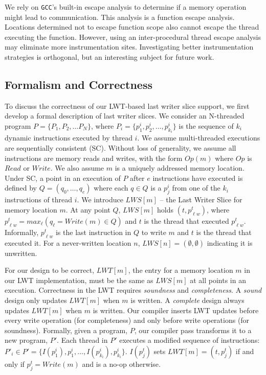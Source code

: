 \documentclass[preprint,9pt]{sigplanconf}
\newcommand{\lwt}{LWT\xspace}
\begin{document}
We rely on {\tt GCC}'s built-in escape analysis to determine if a memory
operation might lead to communication.  This analysis is a function escape
analysis.  Locations determined not to escape function scope also cannot escape
the thread executing the function.  However, using an inter-procedural thread
escape analysis may eliminate more instrumentation sites.  Investigating better
instrumentation strategies is orthogonal, but an interesting subject for future
work.

\subsection{Formalism and Correctness}
\label{sec:lwssoundness}
To discuss the correctness of our \lwt-based last writer slice support, we
first develop a formal description of last writer slices.  We consider an
N-threaded program $P = \{P_1, P_2, \ldots P_N\}$, where $P_i = \{p^{i}_{1},
p^{i}_{2}, \ldots, p^{i}_{k_{i}}\}$ is the sequence of $k_{i}$ dynamic
instructions executed by thread $i$.  We assume multi-threaded executions are
sequentially consistent (SC).  Without loss of generality, we assume all
instructions are memory reads and writes, with the form $Op(m)$ where $Op$ is
$Read$ or $Write$. We also assume $m$ is a uniquely addressed memory location.
Under SC, a point in an execution of $P$ after $e$ instructions have
executed is defined by $Q = (q_{0}, \ldots, q_{e})$ where each $q \in Q$ is a
$p^{i}_{j}$ from one of the $k_i$ instructions of thread $i$. We introduce
$LWS[m]$ -- the Last Writer Slice for memory location $m$.   At any point $Q$,
$LWS[m]$ holds $(t,p^{t}_{\ell w})$, where $p^{t}_{\ell w} = max_{\ell}( 
q_{\ell} = Write(m) \in Q)$ and $t$ is the thread that
executed $p^{t}_{\ell w}$. Informally, $p^{t}_{\ell w}$ is the last instruction
in $Q$ to write $m$ and $t$ is the thread that executed it.  For a
never-written location $n$, $LWS[n] = (\emptyset,\emptyset)$ indicating it is
unwritten.

For our design to be correct, $LWT[m]$, the entry for a memory location $m$ in
our \lwt implementation, must be the same as $LWS[m]$ at all points in an
execution.  Correctness in the \lwt requires {\em soundness} and {\em
completeness}.  A {\em sound} design only updates $LWT[m]$ when $m$ is
written.  A {\em complete} design always updates $LWT[m]$ when $m$ is written.
Our compiler inserts \lwt updates before every write
operation (for completeness) and only before write operations (for soundness).
Formally, given a program, $P$, our compiler pass transforms it to a new
program, $P'$.  Each thread in $P'$ executes a modified sequence of
instructions: $P'_{i} \in P' = \{ I(p^{i}_{1}), p^{i}_{1}, \ldots,
I(p^{i}_{k_{i}}), p^{i}_{k_{i}} \}$.  $I(p^{t}_{j})$ sets $LWT[m] =
(t,p^{t}_{j})$ if and only if $p^{t}_{j} = Write(m)$ and is a no-op otherwise.
\end{document}
